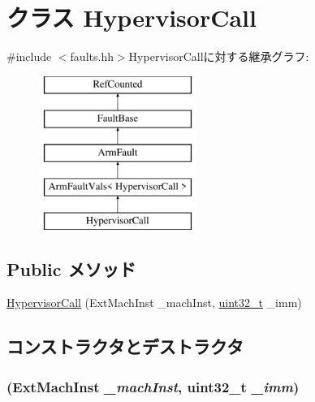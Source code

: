 \hypertarget{classArmISA_1_1HypervisorCall}{
\section{クラス HypervisorCall}
\label{classArmISA_1_1HypervisorCall}
}


{\ttfamily \#include $<$faults.hh$>$}HypervisorCallに対する継承グラフ:\begin{figure}[H]
\begin{center}
\leavevmode
\includegraphics[height=5cm]{classArmISA_1_1HypervisorCall}
\end{center}
\end{figure}
\subsection*{Public メソッド}
\begin{DoxyCompactItemize}
\item 
\hyperlink{classArmISA_1_1HypervisorCall_a019fffca678c1aaa71fb594aa71a2447}{HypervisorCall} (ExtMachInst \_\-machInst, \hyperlink{Type_8hh_a435d1572bf3f880d55459d9805097f62}{uint32\_\-t} \_\-imm)
\end{DoxyCompactItemize}


\subsection{コンストラクタとデストラクタ}
\hypertarget{classArmISA_1_1HypervisorCall_a019fffca678c1aaa71fb594aa71a2447}{
\subsubsection[{HypervisorCall}]{ (ExtMachInst {\em \_\-machInst}, \/  {\bf uint32\_\-t} {\em \_\-imm})}}
\label{classArmISA_1_1HypervisorCall_a019fffca678c1aaa71fb594aa71a2447}



